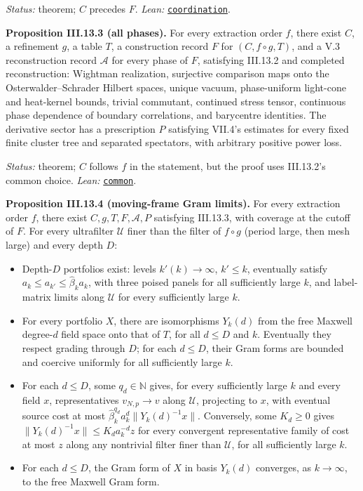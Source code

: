 \documentclass[
  letterpaper,
  11pt]{article}
\providecommand{\tightlist}{%
  \setlength{\itemsep}{0pt}\setlength{\parskip}{0pt}}
\begin{document}
\emph{Status:} theorem; \(C\) precedes \(F\). \emph{Lean:}
\href{https://github.com/yang-mills-group/OpenAI-YM-20261028/blob/3456e5e75cf8d4cd558955a5c7638fba2d68f464/YM/SharpGram/Common.lean\#L16-L37}{\texttt{coordination}}.

\textbf{Proposition III.13.3 (all phases).} For every extraction order
\(f\), there exist \(C\), a refinement \(g\), a table \(T\), a
construction record \(F\) for \((C,f\circ g,T)\), and a V.3
reconstruction record \(\mathcal A\) for every phase of \(F\),
satisfying III.13.2 and completed reconstruction: Wightman realization,
surjective comparison maps onto the Osterwalder--Schrader Hilbert
spaces, unique vacuum, phase-uniform light-cone and heat-kernel bounds,
trivial commutant, continued stress tensor, continuous phase dependence
of boundary correlations, and barycentre identities. The derivative
sector has a prescription \(P\) satisfying VII.4's estimates for every
fixed finite cluster tree and separated spectators, with arbitrary
positive power loss.

\emph{Status:} theorem; \(C\) follows \(f\) in the statement, but the
proof uses III.13.2's common choice. \emph{Lean:}
\href{https://github.com/yang-mills-group/OpenAI-YM-20261028/blob/3456e5e75cf8d4cd558955a5c7638fba2d68f464/YM/SharpGram/Common.lean\#L41-L60}{\texttt{common}}.

\textbf{Proposition III.13.4 (moving-frame Gram limits).} For every
extraction order \(f\), there exist \(C,g,T,F,\mathcal A,P\) satisfying
III.13.3, with coverage at the cutoff of \(F\). For every ultrafilter
\(\mathcal U\) finer than the filter of \(f\circ g\) (period large, then
mesh large) and every depth \(D\):

\begin{itemize}
\tightlist
\item
  Depth-\(D\) portfolios exist: levels \(k'(k)\to\infty\), \(k'\le k\),
  eventually satisfy \(a_k\le a_{k'}\le\hat\beta_ka_k\), with three
  poised panels for all sufficiently large \(k\), and label-matrix
  limits along \(\mathcal U\) for every sufficiently large \(k\).
\item
  For every portfolio \(X\), there are isomorphisms \(Y_k(d)\) from the
  free Maxwell degree-\(d\) field space onto that of \(T\), for all
  \(d\le D\) and \(k\). Eventually they respect grading through \(D\);
  for each \(d\le D\), their Gram forms are bounded and coercive
  uniformly for all sufficiently large \(k\).
\item
  For each \(d\le D\), some \(q_d\in\mathbb N\) gives, for every
  sufficiently large \(k\) and every field \(x\), representatives
  \(v_{N,p}\to v\) along \(\mathcal U\), projecting to \(x\), with
  eventual source cost at most
  \(\hat\beta_k^{q_d}a_k^d\|Y_k(d)^{-1}x\|\). Conversely, some
  \(K_d\ge0\) gives \(\|Y_k(d)^{-1}x\|\le K_da_k^{-d}z\) for every
  convergent representative family of cost at most \(z\) along any
  nontrivial filter finer than \(\mathcal U\), for all sufficiently
  large \(k\).
\item
  For each \(d\le D\), the Gram form of \(X\) in basis \(Y_k(d)\)
  converges, as \(k\to\infty\), to the free Maxwell Gram form.
\end{itemize}
\end{document}
